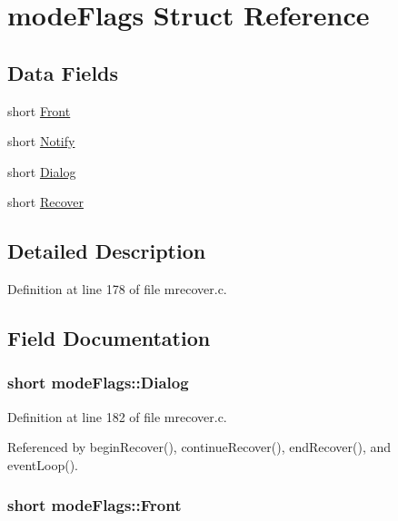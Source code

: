 \hypertarget{structmodeFlags}{\section{mode\+Flags Struct Reference}
\label{structmodeFlags}
}
\subsection*{Data Fields}
\begin{DoxyCompactItemize}
\item 
short \hyperlink{structmodeFlags_a43940af414f26c79079f93c575b21c09}{Front}
\item 
short \hyperlink{structmodeFlags_a31b8bfcea3aac0deaf5d6bcb7d07c622}{Notify}
\item 
short \hyperlink{structmodeFlags_a51f269c6bb93216a1d1d61665aa8b7f9}{Dialog}
\item 
short \hyperlink{structmodeFlags_a098cf3c5051decf3beaf18608ff5881a}{Recover}
\end{DoxyCompactItemize}


\subsection{Detailed Description}


Definition at line 178 of file mrecover.\+c.



\subsection{Field Documentation}
\hypertarget{structmodeFlags_a51f269c6bb93216a1d1d61665aa8b7f9}{
\subsubsection[{Dialog}]{\setlength{\rightskip}{0pt plus 5cm}short mode\+Flags\+::\+Dialog}}\label{structmodeFlags_a51f269c6bb93216a1d1d61665aa8b7f9}


Definition at line 182 of file mrecover.\+c.



Referenced by begin\+Recover(), continue\+Recover(), end\+Recover(), and event\+Loop().

\hypertarget{structmodeFlags_a43940af414f26c79079f93c575b21c09}{
\subsubsection[{Front}]{\setlength{\rightskip}{0pt plus 5cm}short mode\+Flags\+::\+Front}}\label{structmodeFlags_a43940af414f26c79079f93c575b21c09}


